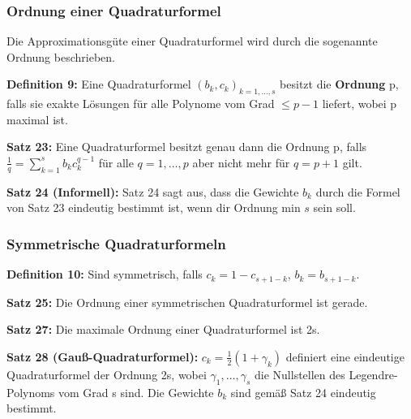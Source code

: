 \documentclass[a4paper]{article}
\begin{document}
\subsubsection{Ordnung einer Quadraturformel}

Die Approximationsgüte einer Quadraturformel wird durch die sogenannte Ordnung
beschrieben.

\textbf{Definition 9:} Eine Quadraturformel $(b_k, c_k)_{k = 1, \dots,s}$
besitzt die \textbf{Ordnung} p, falls sie exakte Lösungen für alle Polynome vom
Grad $\le p - 1$ liefert, wobei p maximal ist.

\textbf{Satz 23:} Eine Quadraturformel besitzt genau dann die Ordnung p, falls
$\frac{1}{q} = \sum\limits_{k = 1}^s b_k c_k^{q - 1}$ für alle $q = 1, \dots, p$
aber nicht mehr für $q = p + 1$ gilt.

\textbf{Satz 24 (Informell):} Satz 24 sagt aus, dass die Gewichte $b_k$ durch
die Formel von Satz 23 eindeutig bestimmt ist, wenn dir Ordnung min $s$ sein
soll.

\subsubsection{Symmetrische Quadraturformeln}

\textbf{Definition 10:} Sind symmetrisch, falls $c_k = 1 - c_{s + 1 -k}$, 
\hspace{1em}
$b_k = b_{s + 1 - k}$.

\textbf{Satz 25:} Die Ordnung einer symmetrischen Quadraturformel ist gerade.

\textbf{Satz 27:} Die maximale Ordnung einer Quadraturformel ist 2s.

\textbf{Satz 28 (Gauß-Quadraturformel):} $c_k = \frac{1}{2} (1 + \gamma_k)$
definiert eine eindeutige Quadraturformel der Ordnung 2s, wobei $\gamma_1,
\dots, \gamma_s$ die Nullstellen des Legendre-Polynoms vom Grad s sind. Die
Gewichte $b_k$ sind gemäß Satz 24 eindeutig bestimmt.
\end{document}
